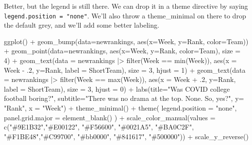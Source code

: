 \documentclass[
  letterpaper,
  DIV=11,
  numbers=noendperiod]{scrreprt}
\newenvironment{Shaded}{\begin{snugshade}}{\end{snugshade}}
\newcommand{\AttributeTok}[1]{\textcolor[rgb]{0.40,0.45,0.13}{#1}}
\newcommand{\DecValTok}[1]{\textcolor[rgb]{0.68,0.00,0.00}{#1}}
\newcommand{\FunctionTok}[1]{\textcolor[rgb]{0.28,0.35,0.67}{#1}}
\newcommand{\NormalTok}[1]{\textcolor[rgb]{0.00,0.23,0.31}{#1}}
\newcommand{\SpecialCharTok}[1]{\textcolor[rgb]{0.37,0.37,0.37}{#1}}
\newcommand{\StringTok}[1]{\textcolor[rgb]{0.13,0.47,0.30}{#1}}
\begin{document}
Better, but the legend is still there. We can drop it in a theme
directive by saying \texttt{legend.position\ =\ "none"}. We'll also
throw a theme\_minimal on there to drop the default grey, and we'll add
some better labeling.

\begin{Shaded}
\begin{Highlighting}[]
\FunctionTok{ggplot}\NormalTok{() }\SpecialCharTok{+} 
  \FunctionTok{geom\_bump}\NormalTok{(}\AttributeTok{data=}\NormalTok{newrankings, }\FunctionTok{aes}\NormalTok{(}\AttributeTok{x=}\NormalTok{Week, }\AttributeTok{y=}\NormalTok{Rank, }\AttributeTok{color=}\NormalTok{Team)) }\SpecialCharTok{+} 
  \FunctionTok{geom\_point}\NormalTok{(}\AttributeTok{data=}\NormalTok{newrankings, }\FunctionTok{aes}\NormalTok{(}\AttributeTok{x=}\NormalTok{Week, }\AttributeTok{y=}\NormalTok{Rank, }\AttributeTok{color=}\NormalTok{Team), }\AttributeTok{size =} \DecValTok{4}\NormalTok{) }\SpecialCharTok{+}   
  \FunctionTok{geom\_text}\NormalTok{(}\AttributeTok{data =}\NormalTok{ newrankings }\SpecialCharTok{|\textgreater{}} \FunctionTok{filter}\NormalTok{(Week }\SpecialCharTok{==} \FunctionTok{min}\NormalTok{(Week)), }\FunctionTok{aes}\NormalTok{(}\AttributeTok{x =}\NormalTok{ Week }\SpecialCharTok{{-}}\NormalTok{ .}\DecValTok{2}\NormalTok{, }\AttributeTok{y=}\NormalTok{Rank, }\AttributeTok{label =}\NormalTok{ ShortTeam), }\AttributeTok{size =} \DecValTok{3}\NormalTok{, }\AttributeTok{hjust =} \DecValTok{1}\NormalTok{) }\SpecialCharTok{+}
  \FunctionTok{geom\_text}\NormalTok{(}\AttributeTok{data =}\NormalTok{ newrankings }\SpecialCharTok{|\textgreater{}} \FunctionTok{filter}\NormalTok{(Week }\SpecialCharTok{==} \FunctionTok{max}\NormalTok{(Week)), }\FunctionTok{aes}\NormalTok{(}\AttributeTok{x =}\NormalTok{ Week }\SpecialCharTok{+}\NormalTok{ .}\DecValTok{2}\NormalTok{, }\AttributeTok{y=}\NormalTok{Rank, }\AttributeTok{label =}\NormalTok{ ShortTeam), }\AttributeTok{size =} \DecValTok{3}\NormalTok{, }\AttributeTok{hjust =} \DecValTok{0}\NormalTok{) }\SpecialCharTok{+}
  \FunctionTok{labs}\NormalTok{(}\AttributeTok{title=}\StringTok{"Was COVID college football boring?"}\NormalTok{, }\AttributeTok{subtitle=}\StringTok{"There was no drama at the top. None. So, yes?"}\NormalTok{, }\AttributeTok{y=} \StringTok{"Rank"}\NormalTok{, }\AttributeTok{x =} \StringTok{"Week"}\NormalTok{) }\SpecialCharTok{+}
  \FunctionTok{theme\_minimal}\NormalTok{() }\SpecialCharTok{+}
  \FunctionTok{theme}\NormalTok{(}
    \AttributeTok{legend.position =} \StringTok{"none"}\NormalTok{,}
    \AttributeTok{panel.grid.major =} \FunctionTok{element\_blank}\NormalTok{()}
\NormalTok{    ) }\SpecialCharTok{+}
  \FunctionTok{scale\_color\_manual}\NormalTok{(}\AttributeTok{values =} \FunctionTok{c}\NormalTok{(}\StringTok{"\#9E1B32"}\NormalTok{,}\StringTok{"\#E00122"}\NormalTok{, }\StringTok{"\#F56600"}\NormalTok{, }\StringTok{"\#0021A5"}\NormalTok{, }\StringTok{"\#BA0C2F"}\NormalTok{, }\StringTok{"\#F1BE48"}\NormalTok{,}\StringTok{"\#C99700"}\NormalTok{, }\StringTok{"\#bb0000"}\NormalTok{, }\StringTok{"\#841617"}\NormalTok{, }\StringTok{"\#500000"}\NormalTok{)) }\SpecialCharTok{+}
  \FunctionTok{scale\_y\_reverse}\NormalTok{() }
\end{Highlighting}
\end{Shaded}
\end{document}
